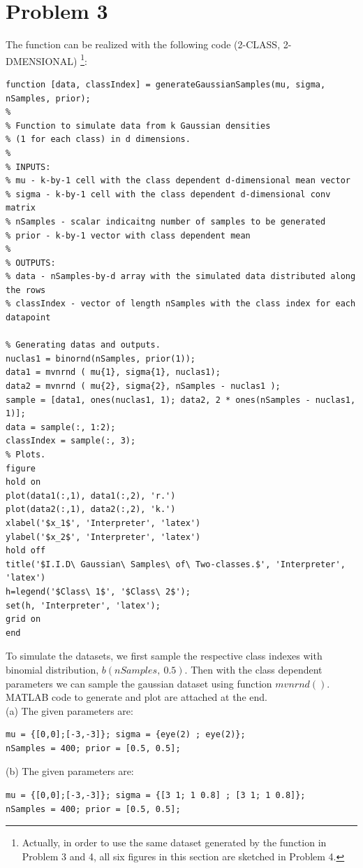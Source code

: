 \documentclass[12pt]{article}
\begin{document}
\section{Problem 3}
The function can be realized with the following code (2-CLASS, 2-DMENSIONAL) \footnote{Actually, in order to use the same dataset generated by the function in Problem 3 and 4, all six figures in this section are sketched in Problem 4.}:
\begin{lstlisting}
function [data, classIndex] = generateGaussianSamples(mu, sigma, nSamples, prior);
%
% Function to simulate data from k Gaussian densities 
% (1 for each class) in d dimensions.
%
% INPUTS:
% mu - k-by-1 cell with the class dependent d-dimensional mean vector
% sigma - k-by-1 cell with the class dependent d-dimensional conv matrix
% nSamples - scalar indicaitng number of samples to be generated
% prior - k-by-1 vector with class dependent mean
%
% OUTPUTS:
% data - nSamples-by-d array with the simulated data distributed along the rows
% classIndex - vector of length nSamples with the class index for each datapoint

% Generating datas and outputs.
nuclas1 = binornd(nSamples, prior(1));
data1 = mvnrnd ( mu{1}, sigma{1}, nuclas1);
data2 = mvnrnd ( mu{2}, sigma{2}, nSamples - nuclas1 );
sample = [data1, ones(nuclas1, 1); data2, 2 * ones(nSamples - nuclas1, 1)];
data = sample(:, 1:2);
classIndex = sample(:, 3);
% Plots.
figure
hold on
plot(data1(:,1), data1(:,2), 'r.')
plot(data2(:,1), data2(:,2), 'k.')
xlabel('$x_1$', 'Interpreter', 'latex')
ylabel('$x_2$', 'Interpreter', 'latex')
hold off
title('$I.I.D\ Gaussian\ Samples\ of\ Two-classes.$', 'Interpreter', 'latex')
h=legend('$Class\ 1$', '$Class\ 2$');
set(h, 'Interpreter', 'latex');
grid on
end
\end{lstlisting}

\noindent To simulate the datasets, we first sample the respective class indexes with binomial distribution, $b(nSamples,\ 0.5)$. Then with the class dependent parameters we can sample the gaussian dataset using function $mvnrnd()$. MATLAB code to generate and plot are attached at the end.\\

\noindent (a) The given parameters are:
\begin{lstlisting}
mu = {[0,0];[-3,-3]}; sigma = {eye(2) ; eye(2)};
nSamples = 400; prior = [0.5, 0.5];
\end{lstlisting}

\noindent (b) The given parameters are:
\begin{lstlisting}
mu = {[0,0];[-3,-3]}; sigma = {[3 1; 1 0.8] ; [3 1; 1 0.8]};
nSamples = 400; prior = [0.5, 0.5];
\end{lstlisting}
\end{document}
